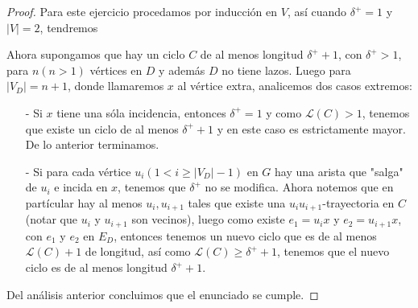 \documentclass{article}
\begin{document}
\begin{enumerate}
  \renewcommand\qedsymbol{QED}
  \begin{proof}
    Para este ejercicio procedamos por inducción en $V$, así cuando
    $\delta^+ = 1$ y $|V| = 2$, tendremos
    
    \begin{center}
    \end{center}

    Ahora supongamos que hay un ciclo $C$ de al menos longitud $\delta^+ +1$,
    con $\delta^+ > 1$, para $n(n > 1)$ vértices en $D$ y además $D$ no
    tiene lazos. Luego para $|V_D| = n +1$, donde llamaremos $x$ al vértice
    extra, analicemos dos casos extremos:
    
    \begin{itemize}
    \item[-] Si $x$ tiene una sóla incidencia, entonces $\delta^+ = 1$ y como
      $\mathcal{L}(C) > 1$, tenemos que existe un ciclo de al menos $\delta^+ +1$
      y en este caso es estrictamente mayor. De lo anterior terminamos.
      
    \item[-] Si para cada vértice $u_i(1 < i \geq |V_D| -1)$ en $G$ hay
      una arista que "salga" de $u_i$ e incida en $x$, tenemos que $\delta^+$
      no se modifica. Ahora notemos que en partícular hay al menos
      $u_i, u_{i +1}$ tales que existe una $u_i u_{i +1}$-trayectoria en $C$
      (notar que $u_i$ y $u_{i +1}$ son vecinos), luego como existe $e_1 = u_i x$
      y $e_{2} = u_{i +1} x$, con $e_1$ y $e_2$ en $E_D$, entonces tenemos
      un nuevo ciclo que es de al menos $\mathcal{L}(C) +1$ de longitud, así
      como $\mathcal{L}(C) \geq \delta^+ +1$, tenemos que el nuevo ciclo es
      de al menos longitud $\delta^+ +1$.
    \end{itemize}
    Del análisis anterior concluimos que el enunciado se cumple.
  \end{proof}
\end{enumerate}
\end{document}

